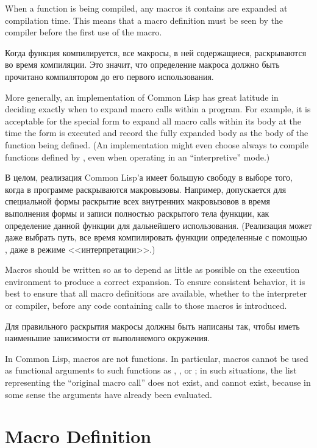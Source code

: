 When a function is being compiled, any macros it contains are expanded
at compilation time.  This means that a macro definition must be seen by the
compiler before the first use of the macro.

Когда функция компилируется, все макросы, в ней содержащиеся, раскрываются во
время компиляции. Это значит, что определение макроса должно быть прочитано
компилятором до его первого использования.

More generally, an implementation of Common Lisp has great latitude in deciding
exactly when to expand macro calls within a program.  For example,
it is acceptable for the  special form to expand all macro
calls within its body at the time the  form is executed
and record the fully expanded body as the body of the function
being defined.
(An implementation might even choose always to compile functions defined
by , even when operating in an ``interpretive'' mode.)

В целом, реализация Common Lisp'а имеет большую свободу в выборе того, когда в
программе раскрываются макровызовы.
Например, допускается для специальной формы  раскрытие всех
внутренних макровызовов в время выполнения формы  и записи полностью
раскрытого тела функции, как определение данной функции для дальнейшего
использования.
(Реализация может даже выбрать путь, все время компилировать функции
определенные с помощью , даже в режиме <<интерпретации>>.)

Macros should be written so as to depend as little as possible
on the execution environment to produce a correct expansion.  To ensure
consistent behavior, it is best to ensure that all macro definitions are
available, whether to the interpreter or compiler, before any code
containing calls to those macros is introduced.

Для правильного раскрытия макросы должны быть написаны так, чтобы иметь
наименьшие зависимости от выполняемого окружения.

In Common Lisp, macros are not functions.
In particular, macros cannot be used as
functional arguments to such functions as , ,
or ; in such situations, the list representing the ``original macro
call'' does not exist, and cannot exist, because in some sense the arguments
have already been evaluated.


\section{Macro Definition}

